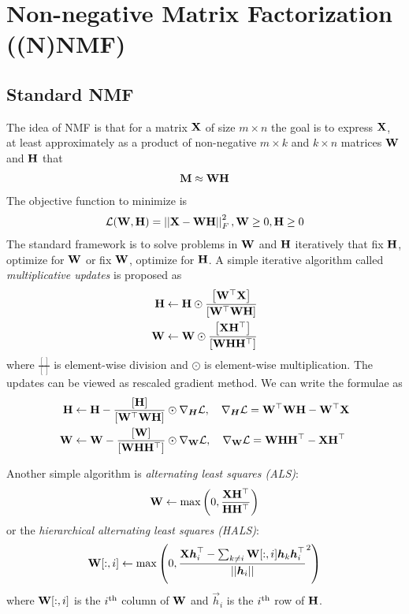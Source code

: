 \section{Non-negative Matrix Factorization ((N)NMF)}

\subsection{Standard NMF}

The idea of NMF is that for a matrix $\mathbf{X}$ of size $m\times n$ the goal is to express $\mathbf{X}$, at least approximately as a product of non-negative $m\times k$ and $k\times n$ matrices $\mathbf{W}$ and $\mathbf{H}$ that
\begin{align*}
	\mathbf{M}\approx\mathbf{W}\mathbf{H}
\end{align*}
The objective function to minimize is
\begin{align*}
	\mathcal{L}(\mathbf{W},\mathbf{H})=\left\vert\left\vert \mathbf{X}-\mathbf{W}\mathbf{H} \right\vert\right\vert_F^2,\mathbf{W}\geq 0,\mathbf{H}\geq 0
\end{align*}
The standard framework is to solve problems in $\mathbf{W}$ and $\mathbf{H}$ iteratively that fix $\mathbf{H}$, optimize for $\mathbf{W}$ or fix $\mathbf{W}$, optimize for $\mathbf{H}$. A simple iterative algorithm called \emph{multiplicative updates} is proposed as
\begin{align*}
	\mathbf{H}&\gets\mathbf{H}\odot\frac{\left[\mathbf{W}{}^\top\mathbf{X}\right]}{\left[\mathbf{W}{}^\top\mathbf{W}\mathbf{H}\right]} \\
	\mathbf{W}&\gets\mathbf{W}\odot\frac{\left[\mathbf{X}\mathbf{H}{}^\top\right]}{\left[\mathbf{W}\mathbf{H}\mathbf{H}{}^\top\right]}
\end{align*}
where $\frac{[]}{[]}$ is element-wise division and $\odot$ is element-wise multiplication. The updates can be viewed as rescaled gradient method. We can write the formulae as
\begin{align*}
	\mathbf{H}&\gets\mathbf{H}-\frac{\left[\mathbf{H}\right]}{\left[\mathbf{W}{}^\top\mathbf{W}\mathbf{H}\right]}\odot\nabla_{\boldsymbol{H}}\mathcal{L},\quad\nabla_{\boldsymbol{H}}\mathcal{L}=\mathbf{W}{}^\top\mathbf{W}\mathbf{H}-\mathbf{W}{}^\top\mathbf{X} \\
	\mathbf{W}&\gets\mathbf{W}-\frac{\left[\mathbf{W}\right]}{\left[\mathbf{W}\mathbf{H}\mathbf{H}{}^\top\right]}\odot\nabla_{\mathbf{W}}\mathcal{L},\quad\nabla_{\mathbf{W}}\mathcal{L}=\mathbf{W}\mathbf{H}\mathbf{H}{}^\top-\mathbf{X}\mathbf{H}{}^\top
\end{align*}

Another simple algorithm is \emph{alternating least squares (ALS)}:
\begin{align*}
	\mathbf{W}\gets\max\left(0,\frac{\mathbf{X}\mathbf{H}{}^\top}{\mathbf{H}\mathbf{H}{}^\top}\right)
\end{align*}
or the \emph{hierarchical alternating least squares (HALS)}:
\begin{align*}
	\mathbf{W}[:,i]\gets\max\left(0,\frac{\mathbf{X}\boldsymbol{h}_i^\top-\sum_{k\neq i}\mathbf{W}[:,i]\boldsymbol{h}_k\boldsymbol{h}_i^\top}{\left\vert\left\vert \boldsymbol{h}_i \right\vert\right\vert}^2\right)
\end{align*}
where $\mathbf{W}[:,i]$ is the $i^\text{th}$ column of $\mathbf{W}$ and $\vec{h}_i$ is the $i^\text{th}$ row of $\mathbf{H}$.

